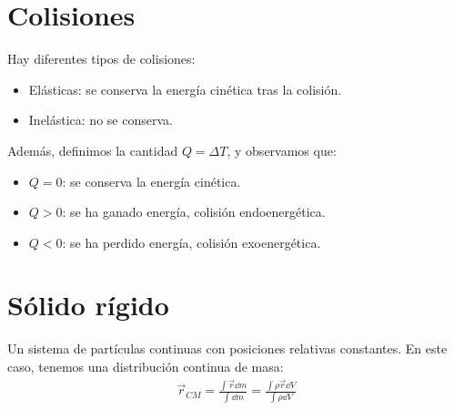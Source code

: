 \documentclass{article}
\begin{document}
\section{Colisiones}
Hay diferentes tipos de colisiones:
\begin{itemize}
    \item Elásticas: se conserva la energía cinética tras la colisión.
    \item Inelástica: no se conserva.
\end{itemize}
Además, definimos la cantidad $Q = \Delta T$, y observamos que:
\begin{itemize}
    \item $Q = 0$: se conserva la energía cinética.
    \item $Q > 0$: se ha ganado energía, colisión endoenergética.
    \item $Q < 0$: se ha perdido energía, colisión exoenergética.
\end{itemize}
\section{Sólido rígido}
Un sistema de partículas continuas con posiciones relativas constantes. En este caso,
tenemos una distribución continua de masa:
\begin{equation}
    \begin{split}
        \vec{r}_{CM} =\frac{ \int \vec{r} \dd{m}}{ \int  \dd{m}}
        = \frac{ \int \rho \vec{r} \dd{V}}{ \int \rho  \dd{V}}
    \end{split}
\end{equation}
\end{document}
